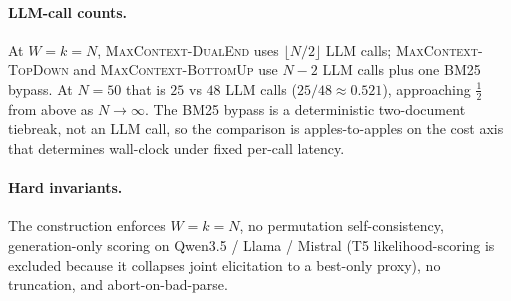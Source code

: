 \paragraph{LLM-call counts.} At $W = k = N$,
\textsc{MaxContext-DualEnd} uses $\lfloor N/2 \rfloor$ LLM calls;
\textsc{MaxContext-TopDown} and \textsc{MaxContext-BottomUp} use $N{-}2$
LLM calls plus one BM25 bypass. At $N{=}50$ that is $25$ vs $48$ LLM
calls ($25/48 \approx 0.521$), approaching $\tfrac{1}{2}$ from above as
$N \to \infty$. The BM25 bypass is a deterministic two-document tiebreak,
not an LLM call, so the comparison is apples-to-apples on the cost axis
that determines wall-clock under fixed per-call latency.

\paragraph{Hard invariants.} The construction enforces $W = k = N$, no
permutation self-consistency, generation-only scoring on Qwen3.5 / Llama /
Mistral (T5 likelihood-scoring is excluded because it collapses joint
elicitation to a best-only proxy), no truncation, and abort-on-bad-parse.
